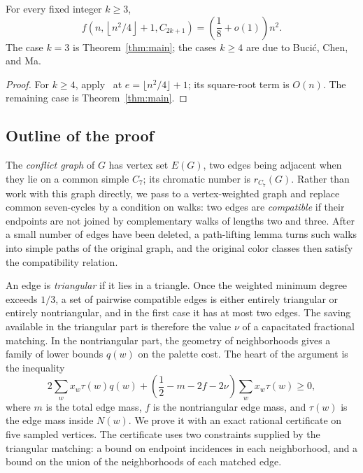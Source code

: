 \begin{corollary}\label{cor:allodd}
For every fixed integer $k\ge3$,
\begin{equation}\label{eq:allodd}
 f\left(n,\left\lfloor n^2/4\right\rfloor+1,C_{2k+1}\right)
 =\left(\frac18+o(1)\right)n^2.
\end{equation}
The case $k=3$ is Theorem~\ref{thm:main}; the cases $k\ge4$ are due to Buci\'c, Chen, and Ma.
\end{corollary}
\begin{proof}
For $k\ge4$, apply~\cite[Theorem~1.2]{BCM2026} at $e=\lfloor n^2/4\rfloor+1$; its square-root term is $O(n)$. The remaining case is Theorem~\ref{thm:main}.
\end{proof}

\subsection{Outline of the proof}
The \emph{conflict graph} of $G$ has vertex set $E(G)$, two edges being adjacent when they lie on a common simple $C_7$; its chromatic number is $r_{C_7}(G)$. Rather than work with this graph directly, we pass to a vertex-weighted graph and replace common seven-cycles by a condition on walks: two edges are \emph{compatible} if their endpoints are not joined by complementary walks of lengths two and three. After a small number of edges have been deleted, a path-lifting lemma turns such walks into simple paths of the original graph, and the original color classes then satisfy the compatibility relation.

An edge is \emph{triangular} if it lies in a triangle. Once the weighted minimum degree exceeds $1/3$, a set of pairwise compatible edges is either entirely triangular or entirely nontriangular, and in the first case it has at most two edges. The saving available in the triangular part is therefore the value $\nu$ of a capacitated fractional matching. In the nontriangular part, the geometry of neighborhoods gives a family of lower bounds $q(w)$ on the palette cost. The heart of the argument is the inequality
\[
 2\sum_wx_w\tau(w)q(w)
 +\left(\frac12-m-2f-2\nu\right)\sum_wx_w\tau(w)\ge0,
\]
where $m$ is the total edge mass, $f$ is the nontriangular edge mass, and $\tau(w)$ is the edge mass inside $N(w)$. We prove it with an exact rational certificate on five sampled vertices. The certificate uses two constraints supplied by the triangular matching: a bound on endpoint incidences in each neighborhood, and a bound on the union of the neighborhoods of each matched edge.

